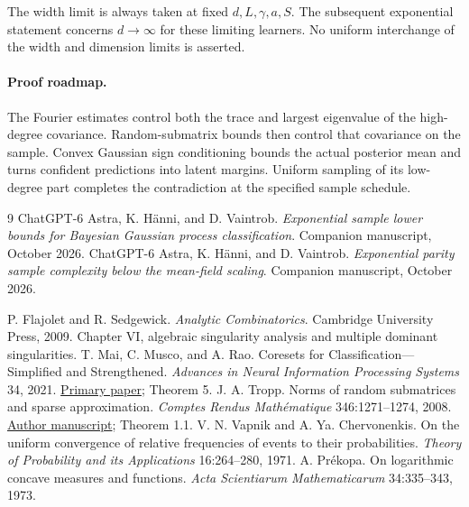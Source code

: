 \documentclass[11pt]{article}
\theoremstyle{remark}\newtheorem{remark}[theorem]{Remark}
\begin{document}
The width limit is always taken at fixed $d,L,\gamma,a,S$. The
subsequent exponential statement concerns $d\to\infty$ for these
limiting learners. No uniform interchange of the width and dimension
limits is asserted.

\paragraph{Proof roadmap.}
The Fourier estimates control both the trace and largest eigenvalue of
the high-degree covariance. Random-submatrix bounds then control that
covariance on the sample. Convex Gaussian sign conditioning bounds the
actual posterior mean and turns confident predictions into latent
margins. Uniform sampling of its low-degree part completes the
contradiction at the specified sample schedule.





\begin{thebibliography}{9}
ChatGPT-6 Astra, K. H\"anni, and D. Vaintrob.
\emph{Exponential sample lower bounds for Bayesian Gaussian process
classification}. Companion manuscript, October 2026.
ChatGPT-6 Astra, K. H\"anni, and D. Vaintrob.
\emph{Exponential parity sample complexity below the mean-field scaling}.
Companion manuscript, October 2026.

P. Flajolet and R. Sedgewick.
\emph{Analytic Combinatorics}. Cambridge University Press, 2009.
Chapter VI, algebraic singularity analysis and multiple dominant
singularities.
T. Mai, C. Musco, and A. Rao.
Coresets for Classification---Simplified and Strengthened.
\emph{Advances in Neural Information Processing Systems} 34, 2021.
\href{https://papers.neurips.cc/paper_files/paper/2021/file/6098ed616e715171f0dabad60a8e5197-Paper.pdf}{Primary paper}; Theorem 5.
J. A. Tropp.
Norms of random submatrices and sparse approximation.
\emph{Comptes Rendus Math\'ematique} 346:1271--1274, 2008.
\href{https://tropp.caltech.edu/papers/Tro08-Norms-Random-v3.pdf}{Author manuscript}; Theorem 1.1.
V. N. Vapnik and A. Ya. Chervonenkis.
On the uniform convergence of relative frequencies of events to their probabilities.
\emph{Theory of Probability and its Applications} 16:264--280, 1971.
A. Pr\'ekopa.
On logarithmic concave measures and functions.
\emph{Acta Scientiarum Mathematicarum} 34:335--343, 1973.
\end{thebibliography}
\end{document}
